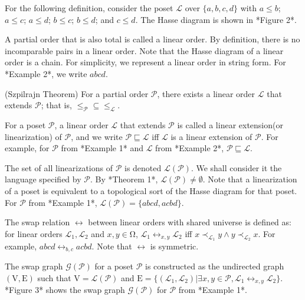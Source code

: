 \documentclass{llncs}
\begin{document}
\begin{example}
    For the following definition, consider the poset $\mathcal{L}$ over $\{a,b,c,d\}$ with $a \leq b$; $a \leq c$; $a \leq d$; $b \leq c$; $b \leq d$; and $c \leq d$. The Hasse diagram is shown in *Figure 2*.
\end{example}

A partial order that is also total is called a linear order. By definition, there is no incomparable pairs in a linear order. Note that the Hasse diagram of a linear order is a chain. For simplicity, we represent a linear order in string form. For *Example 2*, we write $abcd$.

\begin{theorem}
    (Szpilrajn Theorem) For a partial order $\mathcal{P}$, there exists a linear order $\mathcal{L}$ that extends $\mathcal{P}$; that is, $\leq_{\mathcal{P}} \subseteq \leq_{\mathcal{L}}$.
\end{theorem}

For a poset $\mathcal{P}$, a linear order $\mathcal{L}$ that extends $\mathcal{P}$ is called a linear extension(or linearization) of $\mathcal{P}$, and we write $\mathcal{P} \sqsubseteq \mathcal{L}$ iff $\mathcal{L}$ is a linear extension of $\mathcal{P}$. For example, for $\mathcal{P}$ from *Example 1* and $\mathcal{L}$ from *Example 2*, $\mathcal{P} \sqsubseteq \mathcal{L}$.

The set of all linearizations of $\mathcal{P}$ is denoted $\mathcal{L}(\mathcal{P})$. We shall consider it the language specified by $\mathcal{P}$. By *Theorem 1*, $\mathcal{L}(\mathcal{P}) \neq \emptyset$. Note that a linearization of a poset is equivalent to a topological sort of the Hasse diagram for that poset. For $\mathcal{P}$ from *Example 1*, $\mathcal{L}(\mathcal{P}) = \{abcd, acbd\}$.

The swap relation $\leftrightarrow$ between linear orders with shared universe is defined as: for linear orders $\mathcal{L}_{1}, \mathcal{L}_{2}$ and $x, y \in \mathrm{\Omega}$, $\mathcal{L}_{1} \leftrightarrow_{x, y} \mathcal{L}_{2}$ iff $x \prec_{\mathcal{L}_{1}} y \wedge y \prec_{\mathcal{L}_{2}} x$. For example, $abcd \leftrightarrow_{b, c} acbd$. Note that $\leftrightarrow$ is symmetric.

The swap graph $\mathcal{G}(\mathcal{P})$ for a poset $\mathcal{P}$ is constructed as the undirected graph $(\mathrm{V},\mathrm{E})$ such that $\mathrm{V} = \mathcal{L}(\mathcal{P})$ and $\mathrm{E} = \{(\mathcal{L}_{1}, \mathcal{L}_{2}) | \exists x,y \in \mathcal{P}, \mathcal{L}_{1} \leftrightarrow_{x, y} \mathcal{L}_{2}\}$. *Figure 3* shows the swap graph $\mathcal{G}(\mathcal{P})$ for $\mathcal{P}$ from *Example 1*.
\end{document}
